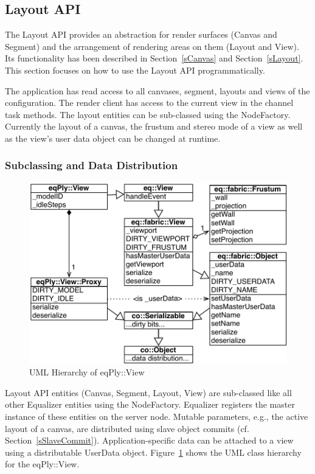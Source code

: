 \documentclass[10pt,a4]{scrartcl}
\newcommand{\fig}[1]{Figure~\ref{#1}}
\newcommand{\sref}[1]{Section~\ref{#1}}
\begin{document}
\subsection{\label{sLayoutAPI}Layout API}

The Layout API provides an abstraction for render surfaces (Canvas and
Segment) and the arrangement of rendering areas on them (Layout and
View). Its functionality has been described in \sref{sCanvas} and
\sref{sLayout}. This section focuses on how to use the Layout API
programmatically. 

The application has read access to all canvases, segment, layouts and views of
the configuration. The render client has access to the current view in the
channel task methods. The layout entities can be sub-classed using the
\textsf{NodeFactory}. Currently the layout of a canvas, the frustum and stereo
mode of a view as well as the view's user data object can be changed at runtime.


\subsubsection{Subclassing and Data Distribution}

\begin{figure}
  \includegraphics[width=.612\textwidth]{images/viewUML.pdf}
  {\caption{\label{fViewUML}UML Hierarchy of \textsf{eqPly::View}}}
\end{figure}
Layout API entities (Canvas, Segment, Layout, View) are sub-classed like all
other Equalizer entities using the \textsf{NodeFactory}. Equalizer registers the
master instance of these entities on the server node. Mutable parameters, e.g.,
the active layout of a canvas, are distributed using slave object commits
(cf. \sref{sSlaveCommit}). Application-specific data can be attached to a view
using a distributable \textsf{UserData} object. \fig{fViewUML} shows the UML
class hierarchy for the \textsf{eqPly::View}.
\end{document}
